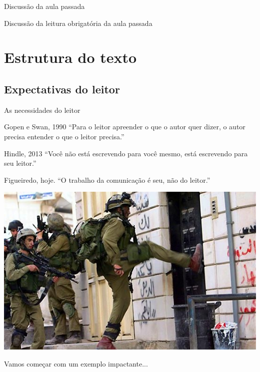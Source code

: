 \documentclass{beamer}
\begin{document}

\begin{frame}{Discussão da aula passada}
  \begin{block}{}
    Discussão da leitura obrigatória da aula passada
  \end{block}
\end{frame}

\section{Estrutura do texto}

\subsection{Expectativas do leitor}

\begin{frame}{As necessidades do leitor}
  \begin{block}{Gopen e Swan, 1990}
    ``Para o leitor apreender o que o autor quer dizer, o autor
    precisa entender o que o leitor precisa.''
  \end{block}\pause
  \begin{block}{Hindle, 2013}
    ``Você não está escrevendo para você mesmo, está escrevendo para
    seu leitor.''
  \end{block}\pause
  \begin{block}{Figueiredo, hoje.}
    ``O \alert{trabalho} da comunicação é seu, não do leitor.''
  \end{block}
\end{frame}

\begin{frame}
  \begin{center}
    \includegraphics[width=\textwidth]{Escrita/penaporta}
  \end{center}
  \bigskip
  Vamos começar com um exemplo impactante...
\end{frame}
\end{document}
